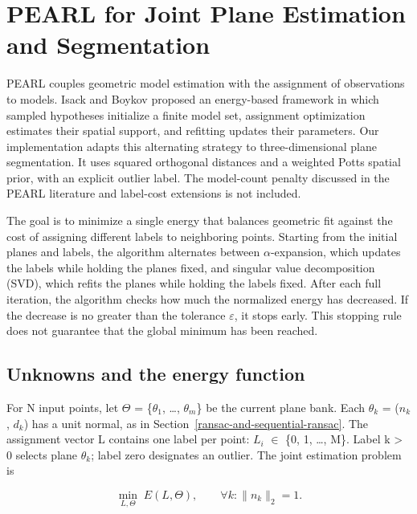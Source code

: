 \section{PEARL for Joint Plane Estimation and Segmentation}\label{pearl-for-joint-plane-estimation-and-segmentation}

PEARL couples geometric model estimation with the assignment of observations to models. Isack and Boykov \cite{isack2012energy} proposed an energy-based framework in which sampled hypotheses initialize a finite model set, assignment optimization estimates their spatial support, and refitting updates their parameters. Our implementation adapts this alternating strategy to three-dimensional plane segmentation. It uses squared orthogonal distances and a weighted Potts spatial prior, with an explicit outlier label. The model-count penalty discussed in the PEARL literature and label-cost extensions \cite{delong2012labelcosts} is not included.

The goal is to minimize a single energy that balances geometric fit against the cost of assigning different labels to neighboring points. Starting from the initial planes and labels, the algorithm alternates between \(\alpha\)-expansion, which updates the labels while holding the planes fixed, and singular value decomposition (SVD), which refits the planes while holding the labels fixed. After each full iteration, the algorithm checks how much the normalized energy has decreased. If the decrease is no greater than the tolerance \(\varepsilon\), it stops early. This stopping rule does not guarantee that the global minimum has been reached.

\subsection{Unknowns and the energy function}\label{unknowns-and-the-energy-function}

For N input points, let \(\Theta\) = \{\(\theta_{1}\), \ldots, \(\theta_{m}\)\} be the current plane bank. Each \(\theta_{k}\) = (\(n_{k}\), \(d_{k}\)) has a unit normal, as in Section~\ref{ransac-and-sequential-ransac}. The assignment vector L contains one label per point: \(L_{i}\) \(\in\) \{0, 1, \ldots, M\}. Label k \textgreater{} 0 selects plane \(\theta_{k}\); label zero designates an outlier. The joint estimation problem is

\begin{equation}
\min_{L,\Theta}\;E(L,\Theta),\qquad \forall k:\|n_k\|_2=1.
\label{eq:13}
\end{equation}

